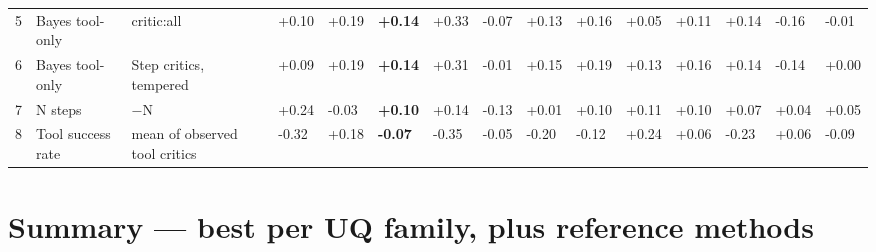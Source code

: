 \documentclass[10pt,a4paper]{article}
\begin{document}
\begin{longtable}{@{}R{8.000mm}L{38.000mm}L{30.000mm}C{14.000mm}C{14.000mm}C{14.000mm}C{14.000mm}C{14.000mm}C{14.000mm}C{14.000mm}C{14.000mm}C{14.000mm}C{14.000mm}C{14.000mm}C{14.000mm}@{}}
5 & Bayes tool-only & critic:all & +0.10 & +0.19 & \textbf{+0.14} & +0.33 & -0.07 & +0.13 & +0.16 & +0.05 & +0.11 & +0.14 & -0.16 & -0.01 \\
6 & Bayes tool-only & Step critics, tempered & +0.09 & +0.19 & \textbf{+0.14} & +0.31 & -0.01 & +0.15 & +0.19 & +0.13 & +0.16 & +0.14 & -0.14 & +0.00 \\
7 & N steps & \ensuremath{-}N & +0.24 & -0.03 & \textbf{+0.10} & +0.14 & -0.13 & +0.01 & +0.10 & +0.11 & +0.10 & +0.07 & +0.04 & +0.05 \\
8 & Tool success rate & mean of observed tool critics & -0.32 & +0.18 & \textbf{-0.07} & -0.35 & -0.05 & -0.20 & -0.12 & +0.24 & +0.06 & -0.23 & +0.06 & -0.09 \\
\end{longtable}
\endgroup
\Needspace{40mm}
\Needspace{40mm}
\section*{Summary --- best per UQ family, plus reference methods}
\begingroup
\scriptsize
\end{document}
